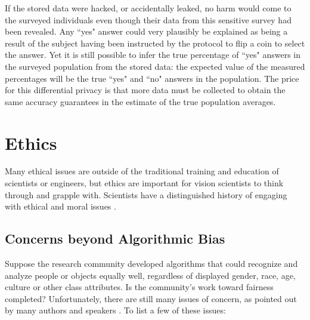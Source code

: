 If the stored data were hacked, or accidentally leaked, no harm would come to the surveyed individuals even though their data from this sensitive survey had been revealed.  Any ``yes" answer could very plausibly be explained as being a result of the subject having been instructed by the protocol to flip a coin to select the answer.  Yet it is still possible to infer the true percentage of ``yes" answers in the surveyed population from the stored data:  the expected value of the measured percentages will be the true ``yes" and ``no" answers in the population.  The price for this differential privacy is that more data must be collected to obtain the same accuracy guarantees in the estimate of the true population averages.


\section{Ethics}
\label{sect:ethics}

Many ethical issues are outside of the traditional training and education of scientists or
engineers, but ethics are important for vision scientists to think
through and grapple with.  Scientists have a distinguished history of engaging
with ethical and moral issues
\cite{Huxley1932,Orwell1948,Kearns2020,Rogaway2015}.

\subsection{Concerns beyond Algorithmic Bias}

Suppose the research community developed algorithms that could recognize and analyze people or objects equally well, regardless of displayed gender, race, age, culture or other class attributes.  Is the community's work toward fairness completed?  Unfortunately, there are still many issues of concern, as pointed out by many authors and speakers \cite{Gebru2020,Gebru2021,Benjamin2019}.
To list a few of these issues:

